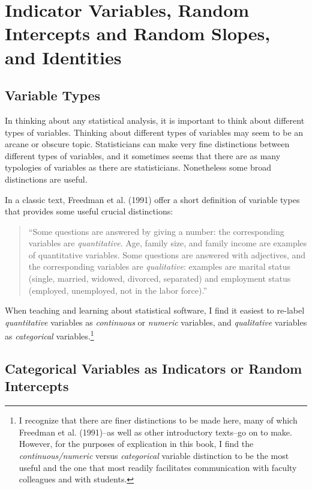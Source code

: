 \documentclass[
  letterpaper,
  DIV=11,
  numbers=noendperiod]{scrreprt}
\begin{document}
\section{Indicator Variables, Random Intercepts and Random Slopes, and
Identities}\label{indicator-variables-random-intercepts-and-random-slopes-and-identities}

\subsection{Variable Types}\label{variable-types}

In thinking about any statistical analysis, it is important to think
about different types of variables. Thinking about different types of
variables may seem to be an arcane or obscure topic. Statisticians can
make very fine distinctions between different types of variables, and it
sometimes seems that there are as many typologies of variables as there
are statisticians. Nonetheless some broad distinctions are useful.

In a classic text, Freedman et al. (1991) offer a short definition of
variable types that provides some useful crucial distinctions:

\begin{quote}
``Some questions are answered by giving a number: the corresponding
variables are \emph{quantitative}. Age, family size, and family income
are examples of quantitative variables. Some questions are answered with
adjectives, and the corresponding variables are \emph{qualitative}:
examples are marital status (single, married, widowed, divorced,
separated) and employment status (employed, unemployed, not in the labor
force).''
\end{quote}

When teaching and learning about statistical software, I find it easiest
to re-label \emph{quantitative} variables as \emph{continuous} or
\emph{numeric} variables, and \emph{qualitative} variables as
\emph{categorical} variables.\footnote{I recognize that there are finer
  distinctions to be made here, many of which Freedman et al. (1991)--as
  well as other introductory texts--go on to make. However, for the
  purposes of explication in this book, I find the
  \emph{continuous/numeric} versus \emph{categorical} variable
  distinction to be the most useful and the one that most readily
  facilitates communication with faculty colleagues and with students.}

\subsection{Categorical Variables as Indicators or Random
Intercepts}\label{categorical-variables-as-indicators-or-random-intercepts}
\end{document}
